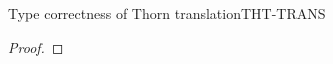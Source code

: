 \documentclass[acmlarge, anonymous, authordraft, review]{acmart} %
\begin{document}
\begin{lemma}{Type correctness of Thorn translation}{THT-TRANS}
  \begin{conds}
    \cond{$\WFpW\K\e$}
    \cond{$\WFtypeW \K\t$}
    \cond{$\HT\x\tp \in \Env \implies \WFtypeW\K\tp$}
    \cond{\EnvTypeW\Env\K\e\t}
    \cond{$\TR\K = \Kp$}
    \cond{$\TR\Env = \Envp$}
  \end{conds}

  \then\axiom{$\EnvType\Envp\cdot\Kp{\TRG{\e}\Env}{\kty\t}$}

  \begin{proof} \indmsg{\EnvTypeW\Env\K\e\t}

% 
% 
% 

\end{proof}
\end{lemma}
\end{document}
